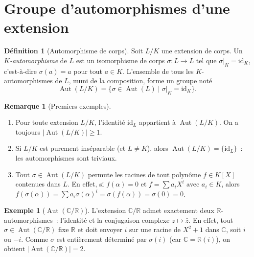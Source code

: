 \documentclass[12pt,a4paper,openany]{book}
\theoremstyle{definition}
\newtheorem{definition}{Définition}[chapter]
\newtheorem{remarque}{Remarque}[chapter]
\newtheorem{exemple}{Exemple}[chapter]
\newcommand{\R}{\mathbb{R}}
\newcommand{\C}{\mathbb{C}}
\newcommand{\Aut}{\operatorname{Aut}}
\begin{document}
\section{Groupe d'automorphismes d'une extension}\label{sec:aut-extension}

\begin{definition}[Automorphisme de corps]\label{def:aut-corps}
Soit $L/K$ une extension de corps. Un
\emph{$K$-auto\-morphisme} de $L$ est un isomorphisme de corps
$\sigma \colon L \to L$ tel que $\sigma|_K = \mathrm{id}_K$, c'est-à-dire
$\sigma(a) = a$ pour tout $a \in K$. L'ensemble de tous les $K$-automorphismes
de $L$, muni de la composition, forme un groupe noté
\[
  \Aut(L/K) = \{\sigma \in \Aut(L) \mid \sigma|_K = \mathrm{id}_K\}.
\]
\end{definition}

\begin{remarque}[Premiers exemples]\label{rem:premiers-exemples-aut}
\begin{enumerate}[label=(\roman*)]
  \item Pour toute extension $L/K$, l'identité $\mathrm{id}_L$ appartient à
    $\Aut(L/K)$. On a toujours $|\Aut(L/K)| \geq 1$.
  \item Si $L/K$ est purement inséparable (et $L \neq K$), alors
    $\Aut(L/K) = \{\mathrm{id}_L\}$~: les automorphismes sont triviaux.
  \item Tout $\sigma \in \Aut(L/K)$ permute les racines de tout polynôme
    $f \in K[X]$ contenues dans $L$. En effet, si $f(\alpha) = 0$ et
    $f = \sum a_i X^i$ avec $a_i \in K$, alors
    $f(\sigma(\alpha)) = \sum a_i \sigma(\alpha)^i = \sigma(f(\alpha))
    = \sigma(0) = 0$.
\end{enumerate}
\end{remarque}

\begin{exemple}[$\Aut(\C/\R)$]\label{ex:aut-C-R}
L'extension $\C/\R$ admet exactement deux $\R$-automorphismes~: l'identité et
la conjugaison complexe $z \mapsto \bar{z}$. En effet, tout
$\sigma \in \Aut(\C/\R)$ fixe $\R$ et doit envoyer $i$ sur une racine de
$X^2 + 1$ dans $\C$, soit $i$ ou $-i$. Comme $\sigma$ est entièrement déterminé
par $\sigma(i)$ (car $\C = \R(i)$), on obtient $|\Aut(\C/\R)| = 2$.
\end{exemple}
\end{document}
